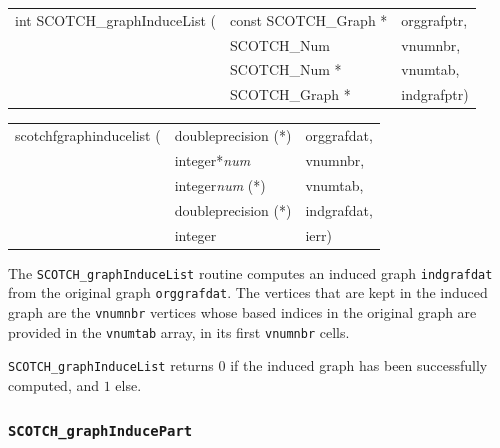 \begin{itemize}
\progsyn

{\tt\begin{tabular}{l@{}ll}
int SCOTCH\_graphInduceList ( & const SCOTCH\_Graph * & orggrafptr, \\
                              & SCOTCH\_Num           & vnumnbr, \\
                              & SCOTCH\_Num *         & vnumtab, \\
                              & SCOTCH\_Graph *       & indgrafptr)
\end{tabular}}

{\tt\begin{tabular}{l@{}ll}
scotchfgraphinducelist ( & doubleprecision (*)   & orggrafdat, \\
                         & integer*{\it num}     & vnumnbr, \\
                         & integer{\it num} (*)  & vnumtab, \\
                         & doubleprecision (*)   & indgrafdat, \\
                         & integer               & ierr)

\end{tabular}}

\progdes

The {\tt SCOTCH\_graphInduceList} routine computes an induced graph 
\texttt{indgrafdat} from the original graph \texttt{orggrafdat}. The
vertices that are kept in the induced graph are the \texttt{vnumnbr}
vertices whose based indices in the original graph are provided in the
\texttt{vnumtab} array, in its first \texttt{vnumnbr} cells.

\progret

{\tt SCOTCH\_graphInduceList} returns $0$ if the induced graph has
been successfully computed, and $1$ else.
\end{itemize}

\subsubsection{{\tt SCOTCH\_graphInducePart}}


